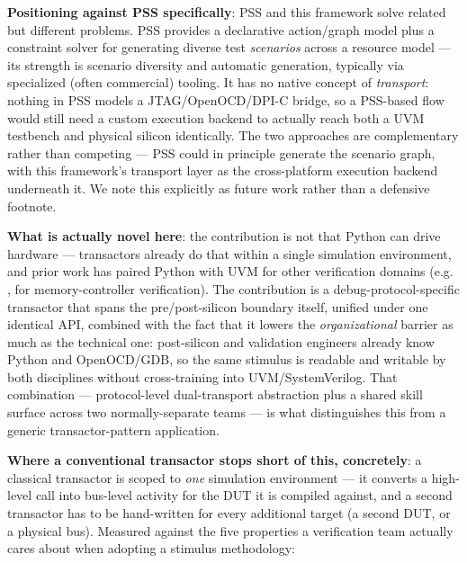 \documentclass[conference]{IEEEtran}
\begin{document}
\textbf{Positioning against PSS specifically}: PSS and this framework solve related but different problems. PSS provides a declarative action/graph model plus a constraint solver for generating diverse test \textit{scenarios} across a resource model --- its strength is scenario diversity and automatic generation, typically via specialized (often commercial) tooling. It has no native concept of \textit{transport}: nothing in PSS models a JTAG/OpenOCD/DPI-C bridge, so a PSS-based flow would still need a custom execution backend to actually reach both a UVM testbench and physical silicon identically. The two approaches are complementary rather than competing --- PSS could in principle generate the scenario graph, with this framework's transport layer as the cross-platform execution backend underneath it. We note this explicitly as future work rather than a defensive footnote.

\textbf{What is actually novel here}: the contribution is not that Python can drive hardware --- transactors already do that within a single simulation environment, and prior work has paired Python with UVM for other verification domains (e.g. \cite{hua2025uvm}, for memory-controller verification). The contribution is a debug-protocol-specific transactor that spans the pre/post-silicon boundary itself, unified under one identical API, combined with the fact that it lowers the \textit{organizational} barrier as much as the technical one: post-silicon and validation engineers already know Python and OpenOCD/GDB, so the same stimulus is readable and writable by both disciplines without cross-training into UVM/SystemVerilog. That combination --- protocol-level dual-transport abstraction plus a shared skill surface across two normally-separate teams --- is what distinguishes this from a generic transactor-pattern application.

\textbf{Where a conventional transactor stops short of this, concretely}: a classical transactor \cite{bergeron2003testbenches} is scoped to \textit{one} simulation environment --- it converts a high-level call into bus-level activity for the DUT it is compiled against, and a second transactor has to be hand-written for every additional target (a second DUT, or a physical bus). Measured against the five properties a verification team actually cares about when adopting a stimulus methodology:
\end{document}

